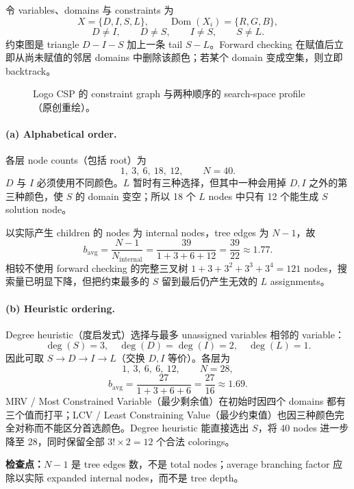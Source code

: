 \begin{checkedsolution}
令 variables、domains 与 constraints 为
\[
  X=\{D,I,S,L\},\qquad
  \operatorname{Dom}(X_i)=\{R,G,B\},
\]
\[
  D\ne I,\qquad D\ne S,\qquad I\ne S,\qquad S\ne L.
\]
约束图是 triangle $D-I-S$ 加上一条 tail $S-L$。Forward checking 在赋值后立即从尚未赋值的邻居 domains 中删除该颜色；若某个 domain 变成空集，则立即 backtrack。

\begin{figure}[htbp]
  \centering
  \resizebox{0.98\textwidth}{!}{}
  \caption{Logo CSP 的 constraint graph 与两种顺序的 search-space profile（原创重绘）。}
  \label{fig:sc3000-tut02-csp-profile}
\end{figure}

\paragraph{(a) Alphabetical order.}
各层 node counts（包括 root）为
\[
  \boxed{1,\ 3,\ 6,\ 18,\ 12},
  \qquad N=\boxed{40}.
\]
$D$ 与 $I$ 必须使用不同颜色。$L$ 暂时有三种选择，但其中一种会用掉 $D,I$ 之外的第三种颜色，使 $S$ 的 domain 变空；所以 18 个 $L$ nodes 中只有 12 个能生成 $S$ solution node。

以实际产生 children 的 nodes 为 internal nodes，tree edges 为 $N-1$，故
\[
  b_{\mathrm{avg}}
  =\frac{N-1}{N_{\mathrm{internal}}}
  =\frac{39}{1+3+6+12}
  =\boxed{\frac{39}{22}\approx1.77}.
\]
相较不使用 forward checking 的完整三叉树 $1+3+3^2+3^3+3^4=121$ nodes，搜索量已明显下降，但把约束最多的 $S$ 留到最后仍产生无效的 $L$ assignments。

\paragraph{(b) Heuristic ordering.}
Degree heuristic（度启发式）选择与最多 unassigned variables 相邻的 variable：
\[
  \deg(S)=3,\quad \deg(D)=\deg(I)=2,\quad \deg(L)=1.
\]
因此可取 $S\to D\to I\to L$（交换 $D,I$ 等价）。各层为
\[
  \boxed{1,\ 3,\ 6,\ 6,\ 12},
  \qquad N=\boxed{28},
\]
\[
  b_{\mathrm{avg}}
  =\frac{27}{1+3+6+6}
  =\boxed{\frac{27}{16}\approx1.69}.
\]
MRV / Most Constrained Variable（最少剩余值）在初始时因四个 domains 都有三个值而打平；LCV / Least Constraining Value（最少约束值）也因三种颜色完全对称而不能区分首选颜色。Degree heuristic 能直接选出 $S$，将 40 nodes 进一步降至 28，同时保留全部 $3!\times2=12$ 个合法 colorings。
\end{checkedsolution}

\textbf{检查点：}$N-1$ 是 tree edges 数，不是 total nodes；average branching factor 应除以实际 expanded internal nodes，而不是 tree depth。


